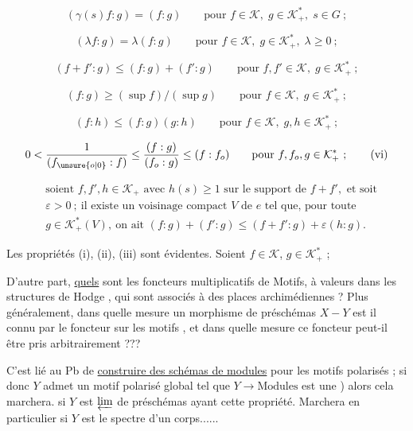\[
(\gamma(s)f:g)=(f:g)\qquad\text{pour }f\in\mathcal{K},\;g\in\mathcal{K}_+^*,\;s\in G\ ; \tag*{(i)}
\]

\[
(\lambda f:g)=\lambda(f:g)\qquad\text{pour }f\in\mathcal{K},\;g\in\mathcal{K}_+^*,\;\lambda\geq0\ ; \tag*{(ii)}
\]

\[
(f+f':g)\leq(f:g)+(f':g)\qquad\text{pour }f,f'\in\mathcal{K},\;g\in\mathcal{K}_+^*\ ; \tag*{(iii)}
\]

\[
(f:g)\geq(\sup f)/(\sup g)\qquad\text{pour }f\in\mathcal{K},\;g\in\mathcal{K}_+^*\ ; \tag*{(iv)}
\]

\[
(f:h)\leq(f:g)(g:h)\qquad\text{pour }f\in\mathcal{K},\;g,h\in\mathcal{K}_+^*\ ; \tag*{(v)}
\]

\[
0<\frac{1}{(f_{\unsure{o|0}}:f)}\leq\frac{(f:g)}{(f_o:g)}\leq(f:f_o)\qquad\text{pour }f,f_o,g\in\mathcal{K}_+^*\ ; \tag*{(vi)}
\]

\[
\begin{aligned}
&\text{soient } f,f',h\in\mathcal{K}_+\text{ avec }h(s)\geq1\text{ sur le support de }f+f',\text{ et soit}\\
&\varepsilon>0\ ;\ \text{il existe un voisinage compact }V\text{ de }e\text{ tel que, pour toute}\\
&g\in\mathcal{K}_+^*(V),\ \text{on ait }(f:g)+(f':g)\leq(f+f':g)+\varepsilon(h:g).
\end{aligned} \tag*{(vii)}
\]

Les propriétés (i), (ii), (iii) sont évidentes. Soient $f\in\mathcal{K}$, $g\in\mathcal{K}_+^*$ ;

D'autre part, \uline{quels} sont les foncteurs multiplicatifs de Motifs, à valeurs dans les structures de Hodge , qui sont associés à des places archimédiennes ? Plus généralement, dans quelle mesure un morphisme de préschémas $X\mathbin{-}Y$ est il connu par le foncteur sur les motifs , et dans quelle mesure ce foncteur  peut-il être pris arbitrairement ???

C'est lié au Pb de \uline{construire des schémas de modules} pour les motifs polarisés ; si donc $Y$ admet un motif polarisé global tel que $Y\to\text{Modules}$ est une  )  alors cela marchera.  si $Y$ est $\varprojlim$ de préschémas ayant cette  propriété. Marchera en particulier si $Y$ est le spectre d'un corps......


